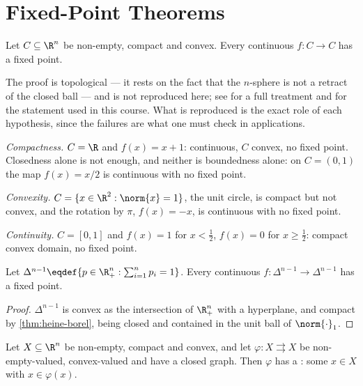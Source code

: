 \section{Fixed-Point Theorems}\label{sec:fixed-points}

\begin{theorem}[Brouwer]\label{thm:brouwer}
	Let $C\subseteq\R^{n}$ be non-empty, compact and convex. Every continuous
	$f\colon C\to C$ has a fixed point.
\end{theorem}

The proof is topological --- it rests on the fact that the $n$-sphere is not a
retract of the closed ball --- and is not reproduced here; see
\textcite[Ch.~E]{ok2007real} for a full treatment and
\textcite[p.~270]{fukuda2026notes} for the statement used in this course. What is
reproduced is the exact role of each hypothesis, since the failures are what one
must check in applications.

\begin{eg}\label{eg:brouwer-failures}
	\emph{Compactness.} $C=\R$ and $f(x)=x+1$: continuous, $C$ convex, no fixed
	point. Closedness alone is not enough, and neither is boundedness alone: on
	$C=(0,1)$ the map $f(x)=x/2$ is continuous with no fixed point.

	\emph{Convexity.} $C=\{x\in\R^{2} : \norm{x}=1\}$, the unit circle, is compact
	but not convex, and the rotation by $\pi$, $f(x)=-x$, is continuous with no
	fixed point.

	\emph{Continuity.} $C=[0,1]$ and $f(x)=1$ for $x<\tfrac12$, $f(x)=0$ for
	$x\geq\tfrac12$: compact convex domain, no fixed point.
\end{eg}

\begin{corollary}\label{cor:brouwer-simplex}
	Let $\Delta^{n-1}\eqdef\{p\in\R^{n}_{+} : \sum_{i=1}^{n}p_i=1\}$. Every
	continuous $f\colon\Delta^{n-1}\to\Delta^{n-1}$ has a fixed point.
\end{corollary}

\begin{proof}
	$\Delta^{n-1}$ is convex as the intersection of $\R^n_+$ with a hyperplane, and
	compact by \autoref{thm:heine-borel}, being closed and contained in the unit
	ball of $\norm{\cdot}_1$.
\end{proof}

\begin{theorem}[Kakutani]\label{thm:kakutani}
	Let $X\subseteq\R^{n}$ be non-empty, compact and convex, and let
	$\varphi\colon X\rightrightarrows X$ be non-empty-valued, convex-valued and have
	a closed graph. Then $\varphi$ has a : some $x\in X$ with $x\in\varphi(x)$.
\end{theorem}

